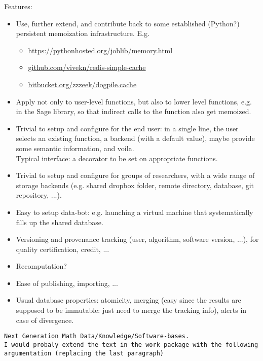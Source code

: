 \begin{Workpackage}{\thewpno}
\begin{WPDeliverables}
\begin{itemize}
  Features:
  \begin{itemize}
  \item Use, further extend, and contribute back to some established
    (Python?) persistent memoization infrastructure. E.g.
    \begin{itemize}
    \item \url{https://pythonhosted.org/joblib/memory.html}
    \item \url{github.com/vivekn/redis-simple-cache}
    \item \url{bitbucket.org/zzzeek/dogpile.cache}
    \end{itemize}
  \item Apply not only to user-level functions, but also to lower
    level functions, e.g. in the Sage library, so that indirect calls
    to the function also get memoized.
  \item Trivial to setup and configure for the end user: in a single
    line, the user selects an existing function, a backend (with a
    default value), maybe provide some semantic information, and
    voila. \\
    Typical interface: a decorator to be set on appropriate functions.
  \item Trivial to setup and configure for groups of researchers, with
    a wide range of storage backends (e.g. shared dropbox folder,
    remote directory, database, git repository, ...).
  \item Easy to setup data-bot: e.g. launching a virtual machine that
    systematically fills up the shared database.
  \item Versioning and provenance tracking (user, algorithm, software
    version, ...), for quality certification, credit, ...
  \item Recomputation?
  \item Ease of publishing, importing, ...
  \item Usual database properties: atomicity, merging (easy since the
    results are supposed to be immutable: just need to merge the
    tracking info), alerts in case of divergence.
  \end{itemize}
\end{itemize}
\end{WPDeliverables}
\begin{verbatim}
Next Generation Math Data/Knowledge/Software-bases.
I would probaly extend the text in the work package with the following
argumentation (replacing the last paragraph)


\end{verbatim}
\end{Workpackage}
